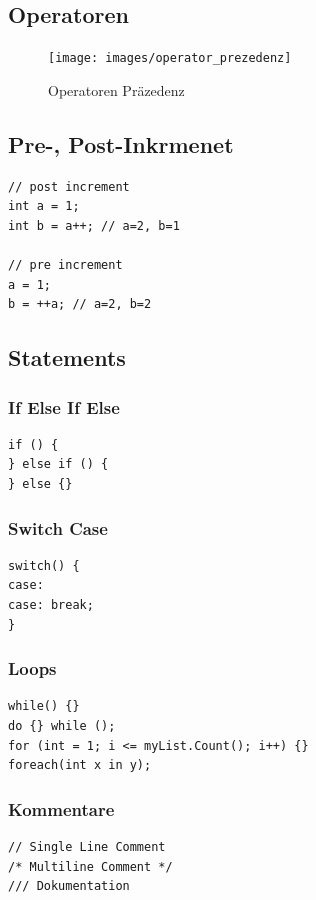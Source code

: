 \newpage

\subsection{Operatoren}
\begin{figure}[h!]
\centering
\texttt{[image: images/operator\_prezedenz]}
\caption{Operatoren Präzedenz}
\label{fig:operatorprezedenz}
\end{figure}

\clearpage

\subsection{Pre-, Post-Inkrmenet}
\begin{lstlisting}
// post increment
int a = 1;
int b = a++; // a=2, b=1

// pre increment
a = 1;
b = ++a; // a=2, b=2
\end{lstlisting}

\subsection{Statements}
\subsubsection{If Else If Else}
\begin{lstlisting}
if () {
} else if () {
} else {}
\end{lstlisting}

\subsubsection{Switch Case}
\begin{lstlisting}
switch() {
case:
case: break;
}
\end{lstlisting}

\subsubsection{Loops}
\begin{lstlisting}
while() {}
do {} while ();
for (int = 1; i <= myList.Count(); i++) {}
foreach(int x in y);
\end{lstlisting}

\subsubsection{Kommentare}
\begin{lstlisting}
// Single Line Comment
/* Multiline Comment */
/// Dokumentation
\end{lstlisting}

